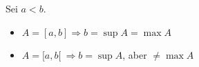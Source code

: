 Sei $a < b$.

\begin{itemize}
    \item $A = [a, b] \Rightarrow b = \sup A = \max A$
    \item $A = [a, b[ \ \Rightarrow b = \sup A$, aber $\neq \max A$
\end{itemize}

